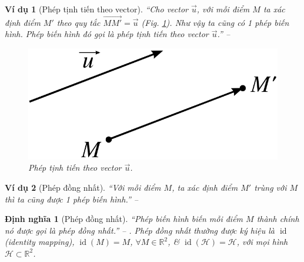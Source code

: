 \documentclass[oneside]{book}
\numberwithin{equation}{section}
\newtheorem{dinhnghia}{Định nghĩa}[section]
\newtheorem{vidu}{Ví dụ}[section]
\begin{document}
\begin{vidu}[Phép tịnh tiến theo vector]
	``Cho vector $\vec{u}$, với mỗi điểm $M$ ta xác định điểm $M'$ theo quy tắc $\overrightarrow{MM'} = \vec{u}$ (Fig. \ref{fig:phep tinh tien theo vector}). Như vậy ta cũng có 1 phép biến hình. Phép biến hình đó gọi là \emph{phép tịnh tiến theo vector $\vec{u}$}.'' -- \cite[p. 4]{SGK_Toan_11_hinh_hoc_nang_cao}
	
	\begin{figure}[H]
		\centering
		\includegraphics[scale=0.15]{phep_tinh_tien_theo_vector}
		\caption{Phép tịnh tiến theo vector $\vec{u}$.}
		\label{fig:phep tinh tien theo vector}
	\end{figure}	
\end{vidu}

\begin{vidu}[Phép đồng nhất]
	``Với mỗi điểm $M$, ta xác định điểm $M'$ trùng với $M$ thì ta cũng được 1 phép biến hình.'' -- \cite[p. 5]{SGK_Toan_11_hinh_hoc_nang_cao}
\end{vidu}

\begin{dinhnghia}[Phép đồng nhất]
	``Phép biến hình biến mỗi điểm $M$ thành chính nó được gọi là \emph{phép đồng nhất}.'' -- \cite[p. 4]{SGK_Toan_11_hinh_hoc_co_ban}. Phép đồng nhất thường được ký hiệu là $\operatorname{id}$ (identity mapping), $\operatorname{id}(M) = M$, $\forall M\in\mathbb{R}^2$, \& $\operatorname{id}(\mathcal{H}) = \mathcal{H}$, với mọi hình $\mathcal{H}\subset\mathbb{R}^2$.
\end{dinhnghia}
\end{document}
